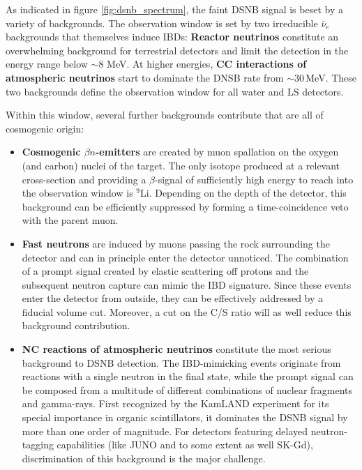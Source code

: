 As indicated in figure \ref{fig:dsnb_spectrum}, the faint DSNB signal is beset by a variety of backgrounds. The observation window is set by two irreducible $\bar\nu_e$ backgrounds that themselves induce IBDs: {\bf Reactor neutrinos} constitute an overwhelming background for terrestrial detectors and limit the detection in the energy range below $\sim$8 MeV. At higher energies, {\bf CC interactions of atmospheric neutrinos} start to dominate the DNSB rate from $\sim$30\,MeV. These two backgrounds define the observation window for all water and LS detectors.

Within this window, several further backgrounds contribute that are all of cosmogenic origin: 
\begin{itemize}
\item {\bf Cosmogenic $\beta n$-emitters} are created by muon spallation on the oxygen (and carbon) nuclei of the target. The only isotope produced at a relevant cross-section and providing a $\beta$-signal of sufficiently high energy to reach into the observation window is $^9$Li. Depending on the depth of the detector, this background can be efficiently suppressed by forming a time-coincidence veto with the parent muon. 
\item {\bf Fast neutrons} are induced by muons passing the rock surrounding the detector and can in principle enter the detector unnoticed. The combination of a prompt signal created by elastic scattering off protons and the subsequent neutron capture can mimic the IBD signature. Since these events enter the detector from outside, they can be effectively addressed by a fiducial volume cut. Moreover, a cut on the C/S ratio will as well reduce this background contribution.
\item {\bf NC reactions of atmospheric neutrinos} constitute the most serious background to DSNB detection.  The IBD-mimicking events originate from reactions with a single neutron in the final state, while the prompt signal can be composed from a multitude of different combinations of nuclear fragments and gamma-rays.  First recognized by the KamLAND experiment for its special importance in organic scintillators, it dominates the DSNB signal by more than one order of magnitude. For detectors featuring delayed neutron-tagging capabilities (like JUNO and to some extent as well SK-Gd), discrimination of this background is the major challenge.
\end{itemize}

